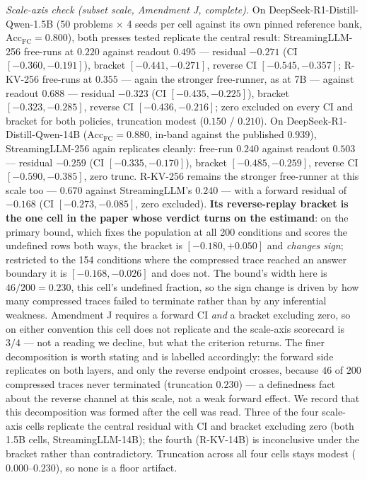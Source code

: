 \documentclass{article}
\newcommand{\accfc}{\mathrm{Acc}_{\mathrm{FC}}}
\begin{document}
\emph{Scale-axis check (subset scale, Amendment J, complete).} On DeepSeek-R1-Distill-Qwen-1.5B (50 problems $\times$ 4 seeds per cell against its own pinned reference bank, $\accfc = 0.800$), both presses tested replicate the central result: StreamingLLM-256 free-runs at $0.220$ against readout $0.495$ --- residual $-0.271$ (CI $[-0.360, -0.191]$), bracket $[-0.441, -0.271]$, reverse CI $[-0.545, -0.357]$; R-KV-256 free-runs at $0.355$ --- again the stronger free-runner, as at 7B --- against readout $0.688$ --- residual $-0.323$ (CI $[-0.435, -0.225]$), bracket $[-0.323, -0.285]$, reverse CI $[-0.436, -0.216]$; zero excluded on every CI and bracket for both policies, truncation modest ($0.150$ / $0.210$). On DeepSeek-R1-Distill-Qwen-14B ($\accfc = 0.880$, in-band against the published $0.939$), StreamingLLM-256 again replicates cleanly: free-run $0.240$ against readout $0.503$ --- residual $-0.259$ (CI $[-0.335, -0.170]$), bracket $[-0.485, -0.259]$, reverse CI $[-0.590, -0.385]$, zero trunc. R-KV-256 remains the stronger free-runner at this scale too --- $0.670$ against StreamingLLM's $0.240$ --- with a forward residual of $-0.168$ (CI $[-0.273, -0.085]$, zero excluded). \textbf{Its reverse-replay bracket is the one cell in the paper whose verdict turns on the estimand}: on the primary bound, which fixes the population at all 200 conditions and scores the undefined rows both ways, the bracket is $[-0.180, +0.050]$ and \emph{changes sign}; restricted to the 154 conditions where the compressed trace reached an answer boundary it is $[-0.168, -0.026]$ and does not. The bound's width here is $46/200 = 0.230$, this cell's undefined fraction, so the sign change is driven by how many compressed traces failed to terminate rather than by any inferential weakness. Amendment J requires a forward CI \emph{and} a bracket excluding zero, so on either convention this cell does not replicate and the scale-axis scorecard is $3/4$ --- not a reading we decline, but what the criterion returns. The finer decomposition is worth stating and is labelled accordingly: the forward side replicates on both layers, and only the reverse endpoint crosses, because $46$ of $200$ compressed traces never terminated (truncation $0.230$) --- a definedness fact about the reverse channel at this scale, not a weak forward effect. We record that this decomposition was formed after the cell was read. Three of the four scale-axis cells replicate the central residual with CI and bracket excluding zero (both 1.5B cells, StreamingLLM-14B); the fourth (R-KV-14B) is inconclusive under the bracket rather than contradictory. Truncation across all four cells stays modest ($0.000$--$0.230$), so none is a floor artifact.
\end{document}
